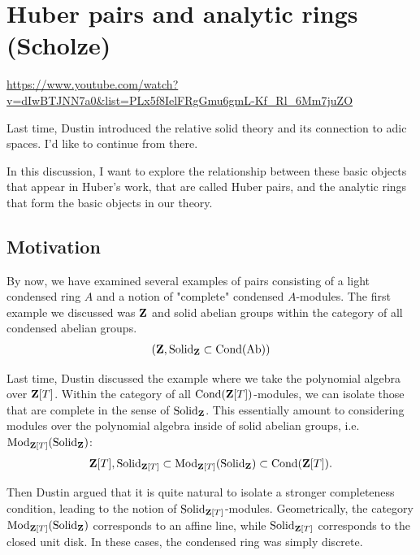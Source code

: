 
\section{\ufs Huber pairs and analytic rings (Scholze)}

\url{https://www.youtube.com/watch?v=dIwBTJNN7a0&list=PLx5f8IelFRgGmu6gmL-Kf_Rl_6Mm7juZO}
\renewcommand{\yt}[2]{\href{https://www.youtube.com/watch?v=dIwBTJNN7a0&list=PLx5f8IelFRgGmu6gmL-Kf_Rl_6Mm7juZO&t=#1}{#2}}
\vspace{1em}

Last time, Dustin introduced the relative solid theory and its connection to adic spaces. I'd like to continue from there.

In this discussion, I want to explore the relationship between these basic objects that appear in Huber's work, that are called Huber pairs, and the analytic rings that form the basic objects in our theory.

\subsection{Motivation}

By now, we have examined several examples of pairs consisting of a light condensed ring $A$ and a notion of "complete" condensed $A$-modules.
The first example we discussed was $\mathbf Z$ and solid abelian groups within the category of all condensed abelian groups.
\begin{align*}
(\mathbf Z, \mathrm{Solid}_{\mathbf Z} \subset \mathrm{Cond}(\mathrm{Ab}))
\end{align*}

Last time, Dustin discussed the example where we take the polynomial algebra over $\mathbf Z[T]$. Within the category of all $\mathrm{Cond}(\mathbf Z[T])$-modules, we can isolate those that are complete in the sense of $\mathrm{Solid}_\mathbf Z$. This essentially amount to considering modules over the polynomial algebra inside of solid abelian groups, i.e. $\operatorname{Mod}_{\mathbf Z[T]}(\mathrm{Solid}_{\mathbf Z})$:
\begin{align*}
\mathbf Z[T], \mathrm{Solid}_{\mathbf Z[T]} \subset \operatorname{Mod}_{\mathbf Z[T]}(\mathrm{Solid}_{\mathbf Z}) \subset \mathrm{Cond}(\mathbf Z[T]).
\end{align*}

Then Dustin argued that it is quite natural to isolate a stronger completeness condition, leading to the notion of $\mathrm{Solid}_{\mathbf Z[T]}$-modules.
Geometrically, the category $\operatorname{Mod}_{\mathbf Z[T]}(\mathrm{Solid}_{\mathbf Z})$ corresponds to an affine line, while $\mathrm{Solid}_{\mathbf Z[T]}$ corresponds to the closed unit disk.
In these cases, the condensed ring was simply discrete.

